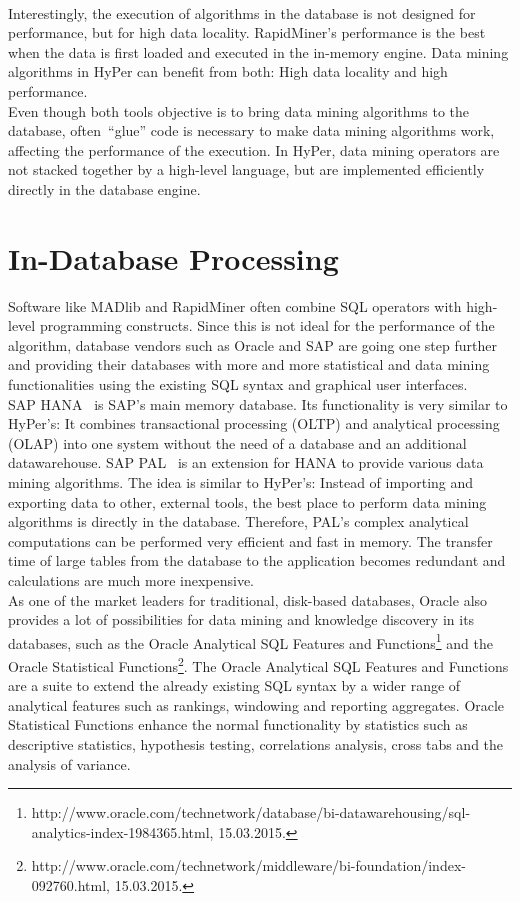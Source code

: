 \\
Interestingly, the execution of algorithms in the database is not designed for performance, but for high data locality. RapidMiner's performance is the best when the data is first loaded and executed in the in-memory engine. Data mining algorithms in HyPer can benefit from both: High data locality and high performance.
\\
Even though both tools objective is to bring data mining algorithms to the database, often~\enquote{glue} code is necessary to make data mining algorithms work, affecting the performance of the execution. In HyPer, data mining operators are not stacked together by a high-level language, but are implemented efficiently directly in the database engine.

\section{In-Database Processing}
Software like MADlib and RapidMiner often combine SQL operators with high-level programming constructs. Since this is not ideal for the performance of the algorithm, database vendors such as Oracle and SAP are going one step further and providing their databases with more and more statistical and data mining functionalities using the existing SQL syntax and graphical user interfaces.
\\
SAP HANA~\parencite{SAP} is SAP's main memory database. Its functionality is very similar to HyPer's: It combines transactional processing (OLTP) and analytical processing (OLAP) into one system without the need of a database and an additional datawarehouse. 
SAP PAL~\parencite{pal} is an extension for HANA to provide various data mining algorithms. The idea is similar to HyPer's: Instead of importing and exporting data to other, external tools, the best place to perform data mining algorithms is directly in the database. Therefore, PAL's complex analytical computations can be performed very efficient and fast in memory. The transfer time of large tables from the database to the application becomes redundant and calculations are much more inexpensive.
\\
As one of the market leaders for traditional, disk-based databases, Oracle also provides a lot of possibilities for data mining and knowledge discovery in its databases, such as the Oracle Analytical SQL Features and Functions\footnote{http://www.oracle.com/technetwork/database/bi-datawarehousing/sql-analytics-index-1984365.html, 15.03.2015.} and the Oracle Statistical Functions\footnote{http://www.oracle.com/technetwork/middleware/bi-foundation/index-092760.html, 15.03.2015.}. The Oracle Analytical SQL Features and Functions are a suite to extend the already existing SQL syntax by a wider range of analytical features such as rankings, windowing and reporting aggregates. Oracle Statistical Functions enhance the normal functionality by statistics such as descriptive statistics, hypothesis testing, correlations analysis, cross tabs and the analysis of variance. 
